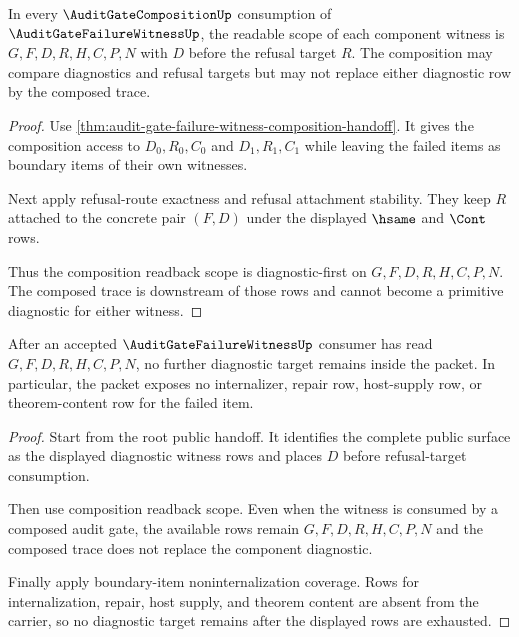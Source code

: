\begin{theorem}
\label{thm:audit-gate-failure-witness-composition-readback-scope}
In every $\AuditGateCompositionUp$ consumption of $\AuditGateFailureWitnessUp$, the readable scope of each component witness is $G,F,D,R,H,C,P,N$ with $D$ before the refusal target $R$. The composition may compare diagnostics and refusal targets but may not replace either diagnostic row by the composed trace.
\end{theorem}
\begin{proof}
Use \autoref{thm:audit-gate-failure-witness-composition-handoff}. It gives the composition access to $D_0,R_0,C_0$ and $D_1,R_1,C_1$ while leaving the failed items as boundary items of their own witnesses.

Next apply refusal-route exactness and refusal attachment stability. They keep $R$ attached to the concrete pair $(F,D)$ under the displayed $\hsame$ and $\Cont$ rows.

Thus the composition readback scope is diagnostic-first on $G,F,D,R,H,C,P,N$. The composed trace is downstream of those rows and cannot become a primitive diagnostic for either witness.
\end{proof}

\begin{theorem}
\label{thm:audit-gate-failure-witness-diagnostic-target-exhaustion}
After an accepted $\AuditGateFailureWitnessUp$ consumer has read $G,F,D,R,H,C,P,N$, no further diagnostic target remains inside the packet. In particular, the packet exposes no internalizer, repair row, host-supply row, or theorem-content row for the failed item.
\end{theorem}
\begin{proof}
Start from the root public handoff. It identifies the complete public surface as the displayed diagnostic witness rows and places $D$ before refusal-target consumption.

Then use composition readback scope. Even when the witness is consumed by a composed audit gate, the available rows remain $G,F,D,R,H,C,P,N$ and the composed trace does not replace the component diagnostic.

Finally apply boundary-item noninternalization coverage. Rows for internalization, repair, host supply, and theorem content are absent from the carrier, so no diagnostic target remains after the displayed rows are exhausted.
\end{proof}

